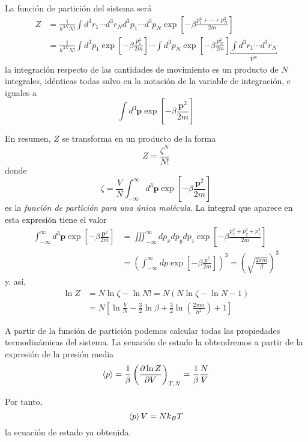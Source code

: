 La función de partición del sistema será
\begin{align}
	Z &= \frac{1}{h^{3N}N!} \int d^3r_1 \cdots d^3r_N d^3p_1 \cdots d^3p_N \exp \left[ -\beta \frac{p_1^2 + \cdots + p_N^2}{2m}\right] \nonumber \\
	  &=  \frac{1}{h^{3N}N!} \int d^3p_1\exp \left[ -\beta \frac{p_1^2}{2m} \right] \cdots \int d^3p_N\exp \left[ -\beta \frac{p_N^2}{2m} \right] \underbracket{\int d^3r_1 \cdots d^3r_N}_{V^N} 
\end{align}
la integración respecto de las cantidades de movimiento es un producto de $N$ integrales, idénticas todas salvo en la notación de la variable de integración, e iguales a
$$\int d^3\mathbf{p} \exp \left[ -\beta \frac{\mathbf{p}^2}{2m} \right]$$

En resumen, $Z$ se transforma en un producto de la forma
\begin{equation}
	\boxed{Z = \frac{\zeta^N}{N!}}
\end{equation}
donde
$$\zeta = \frac{V}{N} \int_{-\infty}^{\infty} d^3\mathbf{p} \exp \left[ -\beta \frac{\mathbf{p}^2}{2m} \right] $$
es la \emph{función de partición para una única molécula}. La integral que aparece en esta expresión tiene el valor
\begin{align}
	\int_{-\infty}^{\infty} d^3\mathbf{p} \exp \left[ -\beta \frac{\mathbf{p}^2}{2m} \right] &= \iiint_{-\infty}^{\infty} dp_x dp_y dp_z \exp \left[ -\beta \frac{p_x^2 + p_y^2 + p_z^2}{2m} \right] \nonumber \\
	&= \left( \int_{-\infty}^{\infty} dp \exp \left[ -\beta \frac{p^2}{2m} \right] \right) ^3 = \left( \sqrt{\frac{2\pi m}{\beta}} \right) ^3
\end{align}
y. así,
\begin{align}
	\ln Z &= N\ln \zeta - \ln N! = N(N\ln \zeta - \ln N - 1 ) \nonumber \\
	&=  N \left[ \ln \frac{V}{N} - \frac{3}{2}\ln \beta + \frac{3}{2}\ln \left( \frac{2\pi m}{h^2} \right)  + 1 \right] 
\end{align}

A partir de la función de partición podemos calcular todas las propiedades termodinámicas del sistema. La ecuación de estado la obtendremos a partir de la expresión de la presión media
\begin{equation}
	\expval{p} = \frac{1}{\beta} \left( \pdv{\ln Z}{V} \right)_{T,N} = \frac{1}{\beta} \frac{N}{V}
\end{equation}

Por tanto,
\begin{equation}
	\expval{p} V = Nk_BT
\end{equation}
la ecuación de estado ya obtenida.


